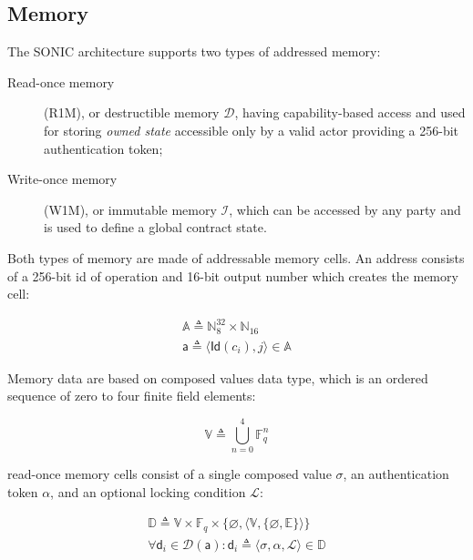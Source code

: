 \documentclass[9pt,oneside]{amsart}
\begin{document}
\begin{multicols}{2}


\subsection{Memory}\label{Memory}

The SONIC architecture supports two types of addressed memory:
\begin{description}
    \item[Read-once memory] (R1M), or \gls{destructible memory} $\mathcal{D}$, having capability-based access
    and used for storing \emph{owned state} accessible only by a valid actor providing a 256-bit
    \gls{authentication token};

    \item[Write-once memory] (W1M), or \gls{immutable memory} $\mathcal{I}$, which can be accessed by any
    party and is used to define a global contract state.
\end{description}

Both types of memory are made of addressable memory cells.
An address consists of a 256-bit id of operation and 16-bit output number
which creates the memory cell:

\begin{gather}
\mathbb{A} \triangleq \mathbb{N}^{32}_8 \times \mathbb{N}_{16} \\
\mathsf{a} \triangleq \langle \mathsf{Id}(c_i), j \rangle \in \mathbb{A}
\end{gather}

Memory data are based on \glspl{composed value} data type,
which is an ordered sequence of zero to four finite field elements:

\begin{equation}
\mathbb{V} \triangleq \bigcup_{n=0}^{4} \mathbb{F}_q^n
\end{equation}

\Gls{read-once memory} cells consist of a single \gls{composed value} $\sigma$,
an \gls{authentication token} $\alpha$, and an optional \gls{locking condition} $\mathcal{L}$:

\begin{gather}
\mathbb{D} \triangleq \mathbb{V} \times \mathbb{F}_q \times \{ \varnothing, \langle \mathbb{V}, \{ \varnothing, \mathbb{E} \} \rangle \} \\
\forall \mathsf{d}_i \in \mathcal{D}(\mathsf{a}) : \mathsf{d}_i \triangleq \langle \sigma, \alpha, \mathcal{L} \rangle \in \mathbb{D}
\end{gather}


\end{multicols}
\end{document}
